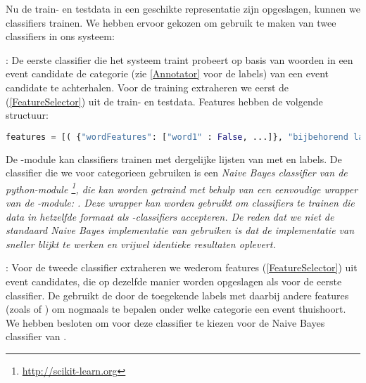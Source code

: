 {{Nu de train- en testdata in een geschikte representatie zijn opgeslagen, kunnen 
we classifiers trainen. We hebben ervoor gekozen om gebruik te maken van twee 
classifiers in ons systeem:

\begin{bullets}
\item {}: De eerste classifier die het systeem traint probeert op 
basis van woorden in een event candidate de categorie (zie \ref{Annotator} voor de labels) 
van een event candidate te achterhalen. Voor de training extraheren we eerst de 
 (\ref{FeatureSelector}) uit de train- en testdata. Features hebben de volgende 
structuur:

\begin{lstlisting}[language=Python]
features = [( {"wordFeatures": ["word1" : False, ...]}, "bijbehorend label"), ...]
\end{lstlisting}

De -module kan classifiers trainen met dergelijke lijsten van  met 
 en labels. De classifier die we voor categorieen gebruiken 
is een \it{Naive Bayes} classifier van de python-module \footnote{\url{http://scikit-learn.org}}, die kan worden 
getraind met behulp van een eenvoudige wrapper van de -module: 
. Deze wrapper kan worden gebruikt om  classifiers 
te trainen die data in hetzelfde formaat als -classifiers accepteren. De 
reden dat we niet de standaard Naive Bayes implementatie van  gebruiken is 
dat de implementatie van  sneller blijkt te werken en vrijwel 
identieke resultaten oplevert.
\item {}: Voor de tweede classifier extraheren we wederom features 
(\ref{FeatureSelector}) uit event candidates, die op dezelfde manier worden opgeslagen als voor 
de eerste classifier. De  gebruikt de door de  
toegekende labels met daarbij andere features (zoals  of 
) om nogmaals te bepalen onder welke categorie een event thuishoort. We 
hebben besloten om voor deze classifier te kiezen voor de Naive Bayes classifier 
van .
\end{bullets}

}}
